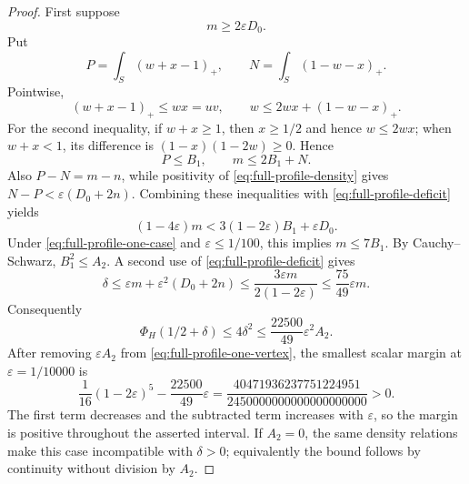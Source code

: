 \documentclass[11pt]{article}
\begin{document}
\begin{proof}
First suppose
\begin{equation}
 m\geq2\varepsilon D_0.
 \label{eq:full-profile-one-case}
\end{equation}
Put
\[
 P=\int_S(w+x-1)_+,\qquad N=\int_S(1-w-x)_+.
\]
Pointwise,
\[
 (w+x-1)_+\leq wx=uv,\qquad
 w\leq2wx+(1-w-x)_+.
\]
For the second inequality, if $w+x\geq1$, then $x\geq1/2$ and hence
$w\leq2wx$; when $w+x<1$, its difference is
$(1-x)(1-2w)\geq0$.  Hence
\[
 P\leq B_1,\qquad m\leq2B_1+N.
\]
Also $P-N=m-n$, while positivity of
\eqref{eq:full-profile-density} gives
$N-P<\varepsilon(D_0+2n)$.  Combining these inequalities with
\eqref{eq:full-profile-deficit} yields
\[
 (1-4\varepsilon)m
 <3(1-2\varepsilon)B_1+\varepsilon D_0.
\]
Under \eqref{eq:full-profile-one-case} and
$\varepsilon\leq1/100$, this implies $m\leq7B_1$.  By
Cauchy--Schwarz, $B_1^2\leq A_2$.  A second use of
\eqref{eq:full-profile-deficit} gives
\[
 \delta
 \leq\varepsilon m+\varepsilon^2(D_0+2n)
 \leq\frac{3\varepsilon m}{2(1-2\varepsilon)}
 \leq\frac{75}{49}\varepsilon m.
\]
Consequently
\[
 \Phi_H(1/2+\delta)
 \leq4\delta^2
 \leq\frac{22500}{49}\varepsilon^2A_2.
\]
After removing $\varepsilon A_2$ from
\eqref{eq:full-profile-one-vertex}, the smallest scalar margin at
$\varepsilon=1/10000$ is
\begin{equation}
 \frac1{16}(1-2\varepsilon)^5-\frac{22500}{49}\varepsilon
 =\frac{40471936237751224951}
        {2450000000000000000000}>0.
 \label{eq:full-profile-one-slack}
\end{equation}
The first term decreases and the subtracted term increases with
$\varepsilon$, so the margin is positive throughout the asserted interval.
If $A_2=0$, the same density relations make this case incompatible with
$\delta>0$; equivalently the bound follows by continuity without division
by $A_2$.


\end{proof}
\end{document}
